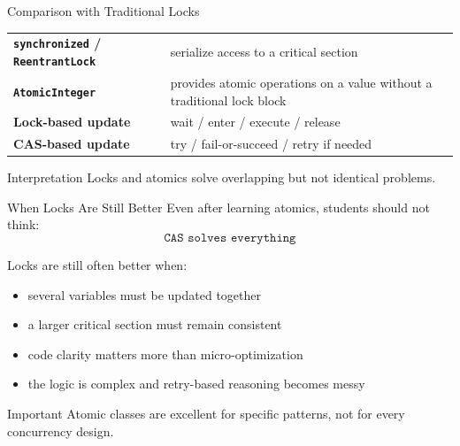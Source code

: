 \documentclass[aspectratio=169,11pt]{beamer}
\begin{document}
	\begin{frame}{Comparison with Traditional Locks}
		\centering
		\begin{tabular}{>{\bfseries}m{3cm} m{6.8cm}}
			\texttt{synchronized} / \texttt{ReentrantLock} & serialize access to a critical section \\
			\texttt{AtomicInteger} & provides atomic operations on a value without a traditional lock block \\
			Lock-based update & wait / enter / execute / release \\
			CAS-based update & try / fail-or-succeed / retry if needed \\
		\end{tabular}
		
		\vspace{0.4cm}
		
		\begin{exampleblock}{Interpretation}
			Locks and atomics solve overlapping but not identical problems.
		\end{exampleblock}
	\end{frame}
	
	\begin{frame}{When Locks Are Still Better}
		Even after learning atomics, students should not think:
		\[
		\texttt{CAS solves everything}
		\]
		
		\vspace{0.35cm}
		
		Locks are still often better when:
		\begin{itemize}
			\item several variables must be updated together
			\item a larger critical section must remain consistent
			\item code clarity matters more than micro-optimization
			\item the logic is complex and retry-based reasoning becomes messy
		\end{itemize}
		
		\vspace{0.35cm}
		
		\begin{alertblock}{Important}
			Atomic classes are excellent for specific patterns, not for every concurrency design.
		\end{alertblock}
	\end{frame}
	
\end{document}
